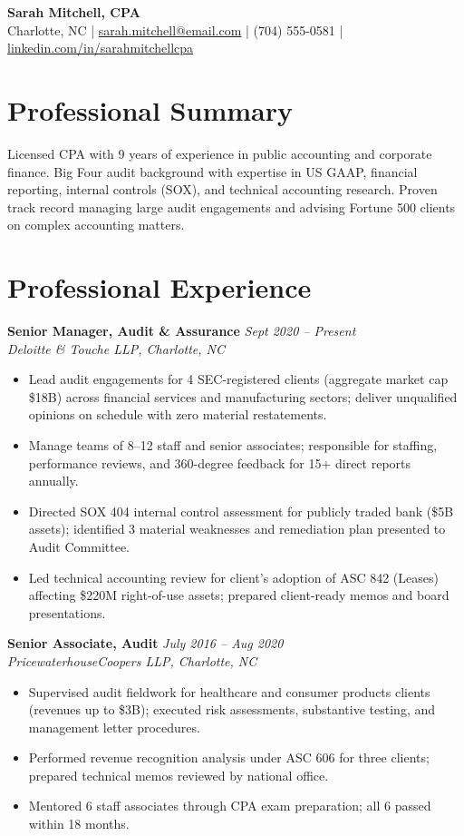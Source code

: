 \documentclass[11pt,a4paper]{article}
\begin{document}
\begin{center}
  {\LARGE \textbf{Sarah Mitchell, CPA}}\\[3pt]
  Charlotte, NC \quad|\quad
  \href{mailto:sarah.mitchell@email.com}{sarah.mitchell@email.com} \quad|\quad
  (704) 555-0581 \quad|\quad
  \href{https://linkedin.com/in/sarahmitchellcpa}{linkedin.com/in/sarahmitchellcpa}
\end{center}

\section{Professional Summary}
Licensed CPA with 9 years of experience in public accounting and corporate finance. Big Four audit background with expertise in US GAAP, financial reporting, internal controls (SOX), and technical accounting research. Proven track record managing large audit engagements and advising Fortune 500 clients on complex accounting matters.

\section{Professional Experience}

\noindent\textbf{Senior Manager, Audit \& Assurance} \hfill \textit{Sept 2020 -- Present}\\
\textit{Deloitte \& Touche LLP, Charlotte, NC}
\begin{itemize}
  \item Lead audit engagements for 4 SEC-registered clients (aggregate market cap \$18B) across financial services and manufacturing sectors; deliver unqualified opinions on schedule with zero material restatements.
  \item Manage teams of 8--12 staff and senior associates; responsible for staffing, performance reviews, and 360-degree feedback for 15+ direct reports annually.
  \item Directed SOX 404 internal control assessment for publicly traded bank (\$5B assets); identified 3 material weaknesses and remediation plan presented to Audit Committee.
  \item Led technical accounting review for client's adoption of ASC 842 (Leases) affecting \$220M right-of-use assets; prepared client-ready memos and board presentations.
\end{itemize}

\vspace{4pt}
\noindent\textbf{Senior Associate, Audit} \hfill \textit{July 2016 -- Aug 2020}\\
\textit{PricewaterhouseCoopers LLP, Charlotte, NC}
\begin{itemize}
  \item Supervised audit fieldwork for healthcare and consumer products clients (revenues up to \$3B); executed risk assessments, substantive testing, and management letter procedures.
  \item Performed revenue recognition analysis under ASC 606 for three clients; prepared technical memos reviewed by national office.
  \item Mentored 6 staff associates through CPA exam preparation; all 6 passed within 18 months.
\end{itemize}
\end{document}
